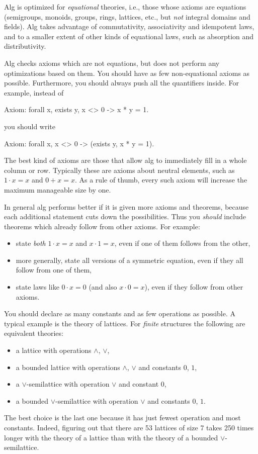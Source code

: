 \documentclass{report}
\begin{document}
Alg is optimized for \emph{equational} theories, i.e., those whose
axioms are equations (semigroups, monoids, groups, rings, lattices,
etc., but \emph{not} integral domains and fields). Alg takes advantage
of commutativity, associativity and idempotent laws, and to a smaller
extent of other kinds of equational laws, such as absorption and
distributivity.

Alg checks axioms which are not equations, but does not perform any
optimizations based on them. You should have as few non-equational
axioms as possible. Furthermore, you should always push all the
quantifiers inside. For example, instead of
%
\begin{shell}
Axiom: forall x, exists y, x <> 0 -> x * y = 1.
\end{shell}
%
you should write
%
\begin{shell}
Axiom: forall x, x <> 0 -> (exists y, x * y = 1).
\end{shell}
%
The best kind of axioms are those that allow alg to immediately fill in
a whole column or row. Typically these are axioms about neutral
elements, such as $1 \cdot x = x$ and $0 + x = x$. As a rule of thumb,
every such axiom will increase the maximum manageable size by one.

In general alg performs better if it is given more axioms and
theorems, because each additional statement cuts down the
possibilities. Thus you \emph{should} include theorems which already
follow from other axioms. For example:
%
\begin{itemize}
\item state \emph{both} $1 \cdot x = x$ and $x \cdot 1 = x$, even if
  one of them follows from the other,
\item more generally, state all versions of a symmetric equation, even
  if they all follow from one of them,
\item state laws like $0 \cdot x = 0$ (and also $x \cdot 0 = x$), even
  if they follow from other axioms.
\end{itemize}

You should declare as many constants and as few operations as
possible. A typical example is the theory of lattices. For
\emph{finite} structures the following are equivalent theories:
%
\begin{itemize}
\item a lattice with operations $\land$, $\lor$,
\item a bounded lattice with operations $\land$, $\lor$
  and constants $0$, $1$,
\item a $\lor$-semilattice with operation $\lor$ and constant $0$,
\item a bounded $\lor$-semilattice with operation $\lor$
  and constants $0$, $1$.
\end{itemize}
%
The best choice is the last one because it has just fewest operation and
most constants. Indeed, figuring out that there are 53 lattices of size
7 takes 250 times longer with the theory of a lattice than with the
theory of a bounded $\lor$-semilattice.
\end{document}
